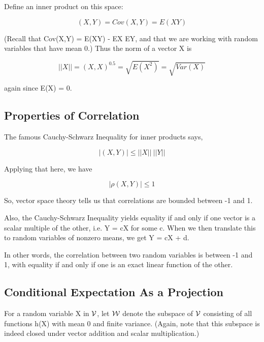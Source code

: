 Define an inner product on this space:

\begin{equation}
(X,Y) = Cov(X,Y) = E(XY) 
\end{equation}

(Recall that Cov(X,Y) = E(XY) - EX EY, and that we are working with
random variables that have mean 0.) Thus the norm of a vector X is

\begin{equation}
||X|| = {(X,X)}^{0.5} = \sqrt{E(X^2)} = \sqrt{Var(X)}
\end{equation}

again since E(X) = 0.

\subsection{Properties of Correlation}
\label{propcorr}

The famous Cauchy-Schwarz Inequality for inner products says,

\begin{equation}
|(X,Y)| \leq ||X|| ~ ||Y||
\end{equation}

Applying that here, we have

\begin{equation}
|\rho(X,Y)| \leq 1
\end{equation}

So, vector space theory tells us that correlations are bounded between
-1 and 1.

Also, the Cauchy-Schwarz Inequality yields equality if and only if one
vector is a scalar multiple of the other, i.e. Y = cX for some c.
When we then translate this to random variables of nonzero means,
we get Y = cX + d.  

In other words, the correlation between two random variables is between
-1 and 1, with equality if and only if one is an exact linear function
of the other.

\subsection{Conditional Expectation As a Projection}
\label{elegant} 

For a random variable X in $\cal V$, let $\cal W$ denote the subspace of
$\cal V$ consisting of all functions h(X) with mean 0 and finite
variance.  (Again, note that this subspace is indeed closed under vector
addition and scalar multiplication.) 

